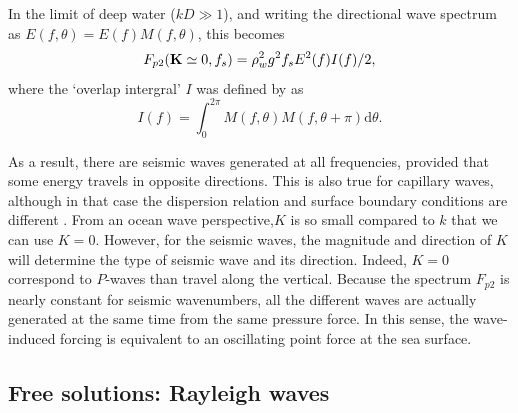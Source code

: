 In the limit of deep water ($kD \gg 1$), and writing the directional wave spectrum as $E(f,\theta)=E(f) M(f,\theta) $, this becomes
\begin{equation}
F_{p2}(\mathbf{K} \simeq 0,f_s)=\rho_w^2 g^2  f_s   E^2(f)I(f)/2,
\end{equation}
where the `overlap intergral' $I$ was defined by \cite{Farrell&Munk2008} as 
\begin{equation}
I(f)=\int_{0}^{2 \pi}M(f,\theta)M(f,\theta+\pi)\mathrm{d}\theta.\label{eq:I}
\end{equation}

As a result, there are seismic waves generated at all frequencies, provided that some energy 
travels in  opposite directions. This is also true for capillary waves, although in that case the dispersion relation and 
surface boundary conditions are different  \citep{Farrell&Munk2008}. 
From an ocean wave perspective,$K$ is so small compared to $k$ that we can use $K=0$. 
However, for the seismic waves, the magnitude and direction of $K$ will determine the type of seismic wave and its direction. 
Indeed, $K=0$ correspond to $P$-waves than travel along the vertical. Because the spectrum $F_{p2}$ is nearly constant for seismic wavenumbers, 
all the different waves are actually generated at the same time from the same pressure force.  In this sense, the wave-induced forcing is equivalent 
to an oscillating point force at the sea surface. 

\subsection{Free solutions: Rayleigh waves}
